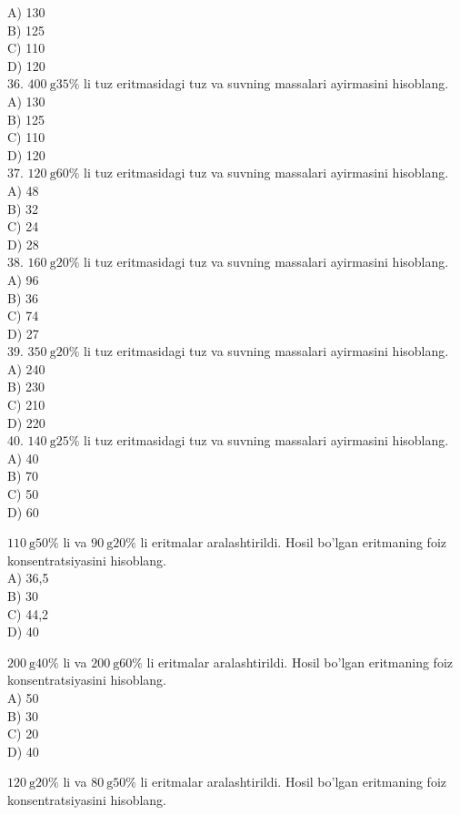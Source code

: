 A) 130\\
B) 125\\
C) 110\\
D) 120\\
36. $400 \mathrm{~g} 35 \%$ li tuz eritmasidagi tuz va suvning massalari ayirmasini hisoblang.\\
A) 130\\
B) 125\\
C) 110\\
D) 120\\
37. $120 \mathrm{~g} 60 \%$ li tuz eritmasidagi tuz va suvning massalari ayirmasini hisoblang.\\
A) 48\\
B) 32\\
C) 24\\
D) 28\\
38. $160 \mathrm{~g} 20 \%$ li tuz eritmasidagi tuz va suvning massalari ayirmasini hisoblang.\\
A) 96\\
B) 36\\
C) 74\\
D) 27\\
39. $350 \mathrm{~g} 20 \%$ li tuz eritmasidagi tuz va suvning massalari ayirmasini hisoblang.\\
A) 240\\
B) 230\\
C) 210\\
D) 220\\
40. $140 \mathrm{~g} 25 \%$ li tuz eritmasidagi tuz va suvning massalari ayirmasini hisoblang.\\
A) 40\\
B) 70\\
C) 50\\
D) 60
  \item $110 \mathrm{~g} 50 \%$ li va $90 \mathrm{~g} 20 \%$ li eritmalar aralashtirildi. Hosil bo'lgan eritmaning foiz konsentratsiyasini hisoblang.\\
A) 36,5\\
B) 30\\
C) 44,2\\
D) 40
  \item $200 \mathrm{~g} 40 \%$ li va $200 \mathrm{~g} 60 \%$ li eritmalar aralashtirildi. Hosil bo'lgan eritmaning foiz konsentratsiyasini hisoblang.\\
A) 50\\
B) 30\\
C) 20\\
D) 40
  \item $120 \mathrm{~g} 20 \%$ li va $80 \mathrm{~g} 50 \%$ li eritmalar aralashtirildi. Hosil bo'lgan eritmaning foiz konsentratsiyasini hisoblang.\\
